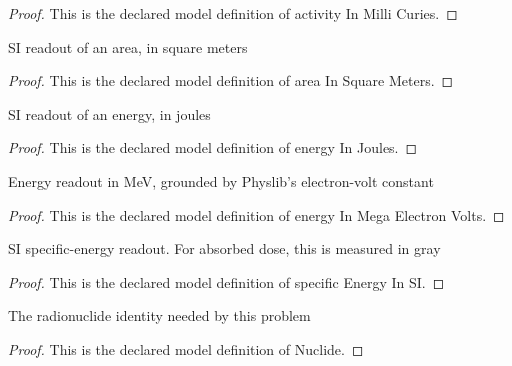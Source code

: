 \begin{proof}
  This is the declared model definition of activity In Milli Curies.
\end{proof}
\begin{definition}
  \label{def:physics:phyx-mini-0619:phyxmini0619-areainsquaremeters}
  SI readout of an area, in square meters
\end{definition}
\begin{proof}
  This is the declared model definition of area In Square Meters.
\end{proof}
\begin{definition}
  \label{def:physics:phyx-mini-0619:phyxmini0619-energyinjoules}
  SI readout of an energy, in joules
\end{definition}
\begin{proof}
  This is the declared model definition of energy In Joules.
\end{proof}
\begin{definition}
  \label{def:physics:phyx-mini-0619:phyxmini0619-energyinmegaelectronvolts}
  Energy readout in MeV, grounded by Physlib's electron-volt constant
\end{definition}
\begin{proof}
  This is the declared model definition of energy In Mega Electron Volts.
\end{proof}
\begin{definition}
  \label{def:physics:phyx-mini-0619:phyxmini0619-specificenergyinsi}
  SI specific-energy readout. For absorbed dose, this is measured in gray
\end{definition}
\begin{proof}
  This is the declared model definition of specific Energy In SI.
\end{proof}
\begin{definition}[Nuclide]
  \label{def:physics:phyx-mini-0619:phyxmini0619-nuclide}
  The radionuclide identity needed by this problem
\end{definition}
\begin{proof}
  This is the declared model definition of Nuclide.
\end{proof}
